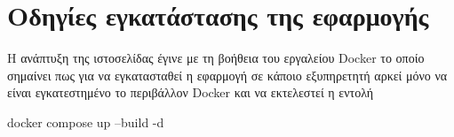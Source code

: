 \documentclass[manuscript,screen,review, language=greek, language=english]{acmart}
\begin{document}



\appendix

\section{Οδηγίες εγκατάστασης της εφαρμογής}
	Η ανάπτυξη της ιστοσελίδας έγινε με τη βοήθεια του εργαλείου Docker το οποίο σημαίνει
	πως για να εγκατασταθεί η εφαρμογή σε κάποιο εξυπηρετητή αρκεί μόνο να είναι
	εγκατεστημένο το περιβάλλον Docker και να εκτελεστεί η εντολή

	docker compose up --build -d
\end{document}
